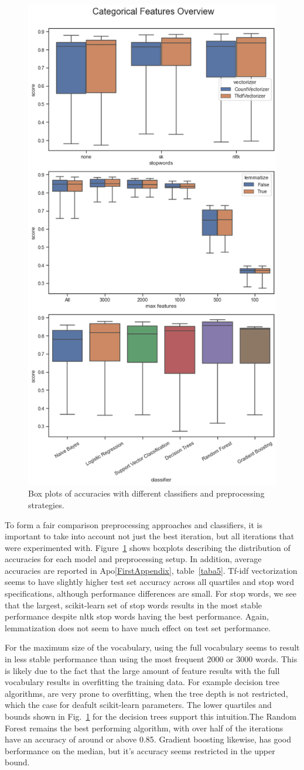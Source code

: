 \documentclass[conference]{IEEEtran}
\begin{document}
\begin{figure}[htbp]
\centerline{\includegraphics[width = 0.5 \textwidth]{fig2.png}}
\caption{Box plots of accuracies with different classifiers and preprocessing strategies.}
\label{fig2}
\end{figure}

To form a fair comparison preprocessing approaches and classifiers, it is important to take into account not just the best iteration, but all iterations that were experimented with. Figure~\ref{fig2}  shows boxplots describing the distribution of accuracies for each model and preprocessing setup. In addition, average accuracies are reported in Apo\ref{FirstAppendix}, table~\ref{taba5}. Tf-idf vectorization seems to have slightly higher test set accuracy across all quartiles and stop word specifications, although performance differences are small. For stop words, we see that the largest, scikit-learn set of stop words results in the most stable performance despite nltk stop words having the best performance. Again, lemmatization does not seem to have much effect on test set performance.

For the maximum size of the vocabulary, using the full vocabulary seems to result in less stable performance than using the most frequent 2000 or 3000 words. This is likely due to the fact that the large amount of feature results with the full vocabulary results in overfitting the training data. For example decision tree algorithms, are very prone to overfitting, when the tree depth is not restricted, which the case for deafult scikit-learn parameters. The lower quartiles and bounds shown in Fig.~\ref{fig2} for the decision trees support this intuition.The Random Forest remains the best performing algorithm, with over half of the iterations have an accuracy of around or above 0.85. Gradient boosting  likewise, has good berformance on the median, but it's accuracy seems restricted in the upper bound.
\end{document}
